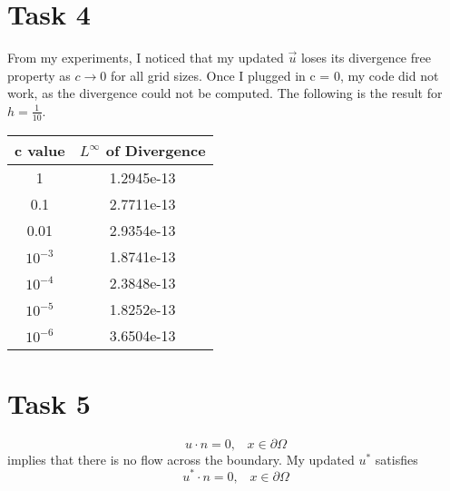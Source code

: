 \documentclass{article}
\begin{document}
\section*{Task 4}
From my experiments, I noticed that my updated $\vec{u}$ loses its divergence free property
as $c \rightarrow 0$ for all grid sizes. 
Once I plugged in c = 0, my code did not work, as the divergence could not be computed.\newline
The following is the result for $h = \frac{1}{10}$.
\begin{center}
    \begin{tabular}{||c c||} 
     \hline
     c value & $L^\infty$ of Divergence  \\ [0.5ex] 
     \hline\hline
     1 & 1.2945e-13 \\ 
     \hline
     0.1 & 2.7711e-13 \\
     \hline
     0.01 & 2.9354e-13 \\
     \hline
     $10^{-3}$ & 1.8741e-13 \\
     \hline
     $10^{-4}$ & 2.3848e-13 \\
     \hline
     $10^{-5}$ &  1.8252e-13 \\
     \hline
     $10^{-6}$ & 3.6504e-13  \\ [1ex] 
     \hline
    \end{tabular}
    \end{center}

\section*{Task 5}
$$u \cdot n = 0, \;\;\; x \in \partial \Omega$$
implies that there is no flow across the boundary.
My updated $u^*$ satisfies
$$u^* \cdot n = 0, \;\;\; x \in \partial \Omega$$
\end{document}

